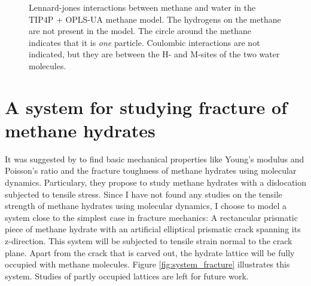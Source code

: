 \begin{figure}
\centering
{}
\caption{Lennard-jones interactions between methane and water in the TIP4P + OPLS-UA methane model. The hydrogens on the methane are not present in the model. The circle around the methane indicates that it is \emph{one} particle. Coulombic interactions are not indicated, but they are between the H- and M-sites of the two water molecules.}
\end{figure}




\section{A system for studying fracture of methane hydrates}
It was suggested by \citet{Ning2012} to find basic mechanical properties like Young's modulus and Poisson's ratio and the fracture toughness of methane hydrates using molecular dynamics. Particulary, they propose to study methane hydrates with a dislocation subjected to tensile stress. Since I have not found any studies on the tensile strength of methane hydrates using molecular dynamics, I choose to model a system close to the simplest case in fracture mechanics: A rectancular prismatic piece of methane hydrate with an artificial elliptical prismatic crack spanning its z-direction. This system will be subjected to tensile strain normal to the crack plane. Apart from the crack that is carved out, the hydrate lattice will be fully occupied with methane molecules. Figure \ref{fig:system_fracture} illustrates this system. Studies of partly occupied lattices are left for future work.


